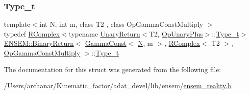 \subsubsection{\texorpdfstring{Type\_t}{Type\_t}\hspace{0.1cm}{\footnotesize\ttfamily [2/2]}}
{\footnotesize\ttfamily template$<$int N, int m, class T2 , class Op\+Gamma\+Const\+Multiply $>$ \\
typedef \mbox{\hyperlink{classENSEM_1_1RComplex}{R\+Complex}}$<$typename \mbox{\hyperlink{structENSEM_1_1UnaryReturn}{Unary\+Return}}$<$T2, \mbox{\hyperlink{structENSEM_1_1OpUnaryPlus}{Op\+Unary\+Plus}}$>$\+::\mbox{\hyperlink{structENSEM_1_1BinaryReturn_3_01GammaConst_3_01N_00_01m_01_4_00_01RComplex_3_01T2_01_4_00_01OpGammaConstMultiply_01_4_ae674dff24be99861079dc4dea357e362}{Type\+\_\+t}}$>$ \mbox{\hyperlink{structENSEM_1_1BinaryReturn}{E\+N\+S\+E\+M\+::\+Binary\+Return}}$<$ \mbox{\hyperlink{classENSEM_1_1GammaConst}{Gamma\+Const}}$<$ \mbox{\hyperlink{operator__name__util_8cc_a7722c8ecbb62d99aee7ce68b1752f337}{N}}, m $>$, \mbox{\hyperlink{classENSEM_1_1RComplex}{R\+Complex}}$<$ T2 $>$, \mbox{\hyperlink{structENSEM_1_1OpGammaConstMultiply}{Op\+Gamma\+Const\+Multiply}} $>$\+::\mbox{\hyperlink{structENSEM_1_1BinaryReturn_3_01GammaConst_3_01N_00_01m_01_4_00_01RComplex_3_01T2_01_4_00_01OpGammaConstMultiply_01_4_ae674dff24be99861079dc4dea357e362}{Type\+\_\+t}}}



The documentation for this struct was generated from the following file\+:\begin{DoxyCompactItemize}
\item 
/\+Users/archanar/\+Kinematic\+\_\+factor/adat\+\_\+devel/lib/ensem/\mbox{\hyperlink{lib_2ensem_2ensem__reality_8h}{ensem\+\_\+reality.\+h}}\end{DoxyCompactItemize}
